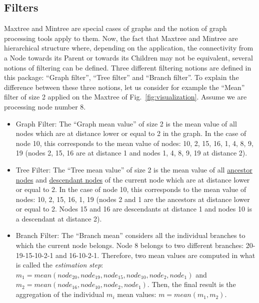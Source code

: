 \documentclass[DIV=calc, paper=a4, fontsize=11pt]{scrartcl}	 %
\begin{document}
\subsection{Filters}
Maxtree and Mintree are special cases of graphs and the notion of graph processing tools apply to them. Now, the fact that Maxtree and Mintree are hierarchical structure where, depending on the application, the connectivity from a Node towards its Parent or towards its Children may not be equivalent, several notions of filtering can be defined. Three different filtering notions are defined in this package: ``Graph filter'', ``Tree filter'' and ``Branch filter''. To explain the difference between these three notions, let us consider for example the ``Mean'' filter of size 2 applied on the Maxtree of Fig.~\ref{fig:visualization}. Assume we are processing node number 8. 
\begin{itemize}
\item Graph Filter: The ``Graph mean value'' of size 2 is the mean value of all nodes which are at distance lower or equal to 2 in the graph. In the case of node 10, this corresponds to the mean value of nodes: 10, 2, 15, 16, 1, 4, 8, 9, 19 (nodes 2, 15, 16 are at distance 1 and nodes 1, 4, 8, 9, 19 at distance 2). 
\item Tree Filter: The ``Tree mean value'' of size 2 is the mean value of all \underline{ancestor nodes} and \underline{descendant nodes} of the current node which are at distance lower or equal to 2. In the case of node 10, this corresponds to the mean value of nodes: 10, 2, 15, 16, 1, 19 (nodes 2 and 1 are the ancestors at distance lower or equal to 2. Nodes 15 and 16 are descendants at distance 1 and nodes 10 is a descendant at distance 2). 
\item Branch Filter: The ``Branch mean'' considers all the individual branches to which the current node belongs. Node 8 belongs to two different branches: 20-19-15-10-2-1 and 16-10-2-1. Therefore, two mean values are computed in what is called the {\em estimation step}: $m_1=mean(node_{20},node_{19},node_{15},node_{10},node_{2},node_{1})$ and $m_2=mean(node_{16},node_{10},node_{2},node_{1})$. Then, the final result is the aggregation of the individual $m_i$ mean values: $m=mean(m_1,m_2)$. 
\end{itemize}
\end{document}
